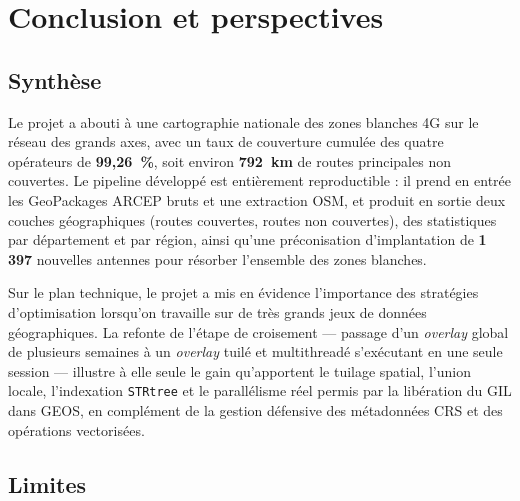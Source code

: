 \documentclass[11pt,a4paper]{article}
\begin{document}
\section{Conclusion et perspectives}

\subsection{Synthèse}

Le projet a abouti à une cartographie nationale des zones blanches 4G sur le réseau des grands axes, avec un taux de couverture cumulée des quatre opérateurs de \textbf{99{,}26~\%}, soit environ \textbf{792~km} de routes principales non couvertes. Le pipeline développé est entièrement reproductible : il prend en entrée les GeoPackages ARCEP bruts et une extraction OSM, et produit en sortie deux couches géographiques (routes couvertes, routes non couvertes), des statistiques par département et par région, ainsi qu'une préconisation d'implantation de \textbf{1\,397} nouvelles antennes pour résorber l'ensemble des zones blanches.

Sur le plan technique, le projet a mis en évidence l'importance des stratégies d'optimisation lorsqu'on travaille sur de très grands jeux de données géographiques. La refonte de l'étape de croisement — passage d'un \emph{overlay} global de plusieurs semaines à un \emph{overlay} tuilé et multithreadé s'exécutant en une seule session — illustre à elle seule le gain qu'apportent le tuilage spatial, l'union locale, l'indexation \texttt{STRtree} et le parallélisme réel permis par la libération du GIL dans GEOS, en complément de la gestion défensive des métadonnées CRS et des opérations vectorisées.

\subsection{Limites}
\end{document}
